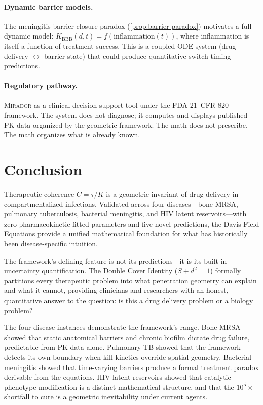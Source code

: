 \documentclass[11pt]{article}
\theoremstyle{plain}
\theoremstyle{definition}
\newcommand{\mirador}{\textsc{Mirador}}
\begin{document}
\paragraph{Dynamic barrier models.}
The meningitis barrier closure paradox (\cref{prop:barrier-paradox})
motivates a full dynamic model: $K_{\mathrm{BBB}}(d, t) =
f(\mathrm{inflammation}(t))$, where inflammation is itself a
function of treatment success. This is a coupled ODE system
(drug delivery $\leftrightarrow$ barrier state) that could produce
quantitative switch-timing predictions.

\paragraph{Regulatory pathway.}
\mirador{} as a clinical decision support tool under the FDA 21~CFR
820 framework. The system does not diagnose; it computes and
displays published PK data organized by the geometric framework.
The math does not prescribe. The math organizes what is already
known.

\section{Conclusion}
\label{sec:conclusion}

Therapeutic coherence $C = \tau / K$ is a geometric invariant of
drug delivery in compartmentalized infections. Validated across four
diseases---bone MRSA, pulmonary tuberculosis, bacterial meningitis,
and HIV latent reservoirs---with zero
pharmacokinetic fitted parameters and five novel predictions, the
Davis Field Equations provide a unified mathematical foundation for
what has historically been disease-specific intuition.

The framework's defining feature is not its predictions---it is its
built-in uncertainty quantification. The Double Cover Identity
($S + d^2 = 1$) formally partitions every therapeutic problem into
what penetration geometry can explain and what it cannot, providing
clinicians and researchers with an honest, quantitative answer to
the question: is this a drug delivery problem or a biology problem?

The four disease instances demonstrate the framework's range. Bone
MRSA showed that static anatomical barriers and chronic biofilm
dictate drug failure, predictable from PK data alone. Pulmonary TB
showed that the framework detects its own boundary when kill
kinetics override spatial geometry. Bacterial meningitis showed that
time-varying barriers produce a formal treatment paradox derivable
from the equations. HIV latent reservoirs showed that catalytic
phenotype modification is a distinct mathematical structure, and
that the $10^5\times$ shortfall to cure is a geometric inevitability
under current agents.
\end{document}
